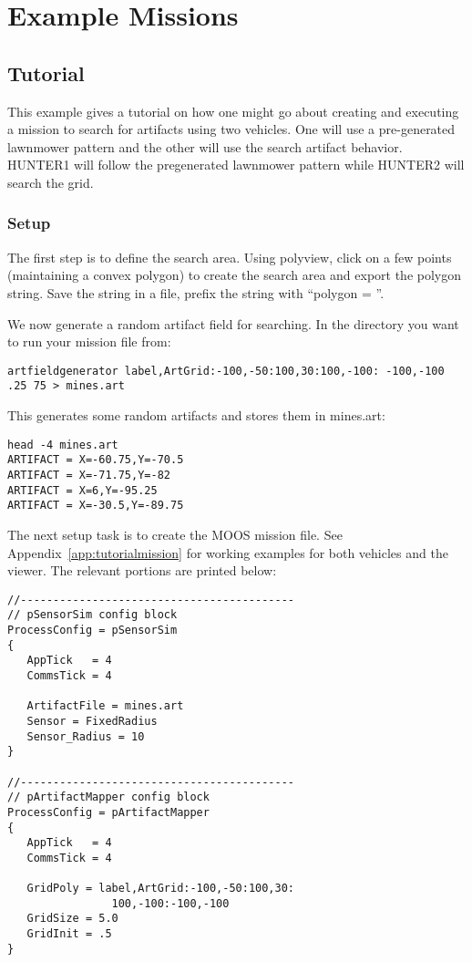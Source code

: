 \section{Example Missions}
\label{examples}

\subsection{Tutorial}
\label{ex:tutorial}
This example gives a tutorial on how one might go about creating and executing a mission to search for artifacts using two vehicles.  One will use a pre-generated lawnmower pattern and the other will use the search artifact behavior.  HUNTER1 will follow the pregenerated lawnmower pattern while HUNTER2 will search the grid.

\subsubsection{Setup}
\label{ex:tutorial:setup}
The first step is to define the search area.  Using polyview, click on a few points (maintaining a convex polygon) to create the search area and export the polygon string.  Save the string in a file, prefix the string with ``polygon = ''.


We now generate a random artifact field for searching.  In the directory you want to run your mission file from:

\scriptsize
{\tt artfieldgenerator label,ArtGrid:-100,-50:100,30:100,-100: -100,-100 .25 75 > mines.art}
\normalsize

This generates some random artifacts and stores them in mines.art:

\scriptsize
\begin{verbatim}
head -4 mines.art 
ARTIFACT = X=-60.75,Y=-70.5
ARTIFACT = X=-71.75,Y=-82
ARTIFACT = X=6,Y=-95.25
ARTIFACT = X=-30.5,Y=-89.75
\end{verbatim}
\normalsize

The next setup task is to create the MOOS mission file.  See Appendix~\ref{app:tutorialmission} for working examples for both vehicles and the viewer.  The relevant portions are printed below:
\scriptsize
\begin{verbatim}
//------------------------------------------
// pSensorSim config block
ProcessConfig = pSensorSim
{
   AppTick   = 4
   CommsTick = 4
   
   ArtifactFile = mines.art
   Sensor = FixedRadius
   Sensor_Radius = 10   
}

//------------------------------------------
// pArtifactMapper config block
ProcessConfig = pArtifactMapper
{
   AppTick   = 4
   CommsTick = 4
   
   GridPoly = label,ArtGrid:-100,-50:100,30:
   				100,-100:-100,-100
   GridSize = 5.0
   GridInit = .5
}
\end{verbatim}
\normalsize

